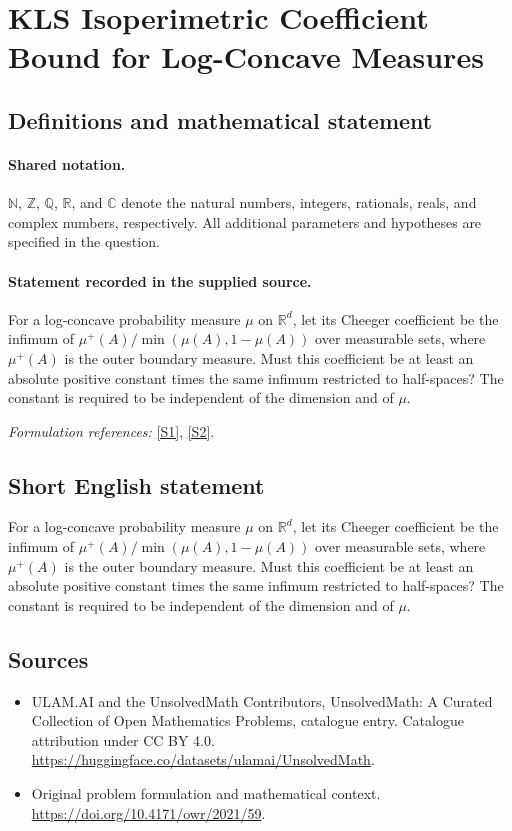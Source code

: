 \documentclass[11pt]{article}
\newcommand{\sref}[2]{\hyperlink{source:#1:#2}{[S#2]}}
\begin{document}
\section{KLS Isoperimetric Coefficient Bound for Log-Concave Measures}\label{statement}

\subsection{Definitions and mathematical statement}

\paragraph{Shared notation.}$\mathbb N$, $\mathbb Z$, $\mathbb Q$, $\mathbb R$, and $\mathbb C$ denote the natural numbers, integers, rationals, reals, and complex numbers, respectively. All additional parameters and hypotheses are specified in the question.


\paragraph{Statement recorded in the supplied source.}
For a log-concave probability measure $\mu$ on $\mathbb R^d$, let its Cheeger coefficient be the infimum of $\mu^+(A)/\min(\mu(A),1-\mu(A))$ over measurable sets, where $\mu^+(A)$ is the outer boundary measure. Must this coefficient be at least an absolute positive constant times the same infimum restricted to half-spaces? The constant is required to be independent of the dimension and of $\mu$.
\par\smallskip\textit{Formulation references:} \sref{statement}{1}, \sref{statement}{2}.
\subsection{Short English statement}
For a log-concave probability measure $\mu$ on $\mathbb R^d$, let its Cheeger coefficient be the infimum of $\mu^+(A)/\min(\mu(A),1-\mu(A))$ over measurable sets, where $\mu^+(A)$ is the outer boundary measure. Must this coefficient be at least an absolute positive constant times the same infimum restricted to half-spaces? The constant is required to be independent of the dimension and of $\mu$.
\subsection{Sources}
\begin{itemize}
\item[\hypertarget{source:statement:1}{S1}] ULAM.AI and the UnsolvedMath Contributors, UnsolvedMath: A Curated Collection of Open Mathematics Problems, catalogue entry. Catalogue attribution under CC BY 4.0.
\url{https://huggingface.co/datasets/ulamai/UnsolvedMath}.
\item[\hypertarget{source:statement:2}{S2}] Original problem formulation and mathematical context.
\url{https://doi.org/10.4171/owr/2021/59}.
\end{itemize}
\label{end:statement}
\end{document}
